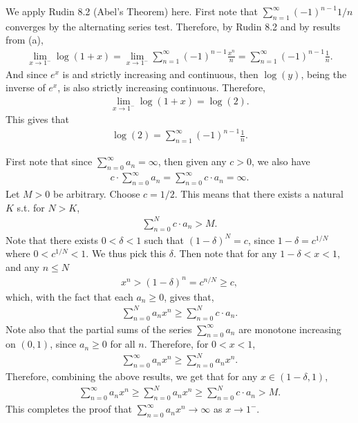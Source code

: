 \documentclass[12pt]{article}
\begin{document}
\begin{fproof}[1(b)]
 We apply Rudin 8.2 (Abel's Theorem) here.
 First note that \(\sum_{n=1}^{\infty} (-1)^{n-1}1/n\) converges by the alternating series test.
 Therefore, by Rudin 8.2 and by results from (a),
 \begin{align*}
    \lim_{x \to 1^-} \log(1+x) = \lim_{x \to 1^-} \sum_{n=1}^{\infty} (-1)^{n-1} \frac{x^n}{n}=  \sum_{n=1}^{\infty} (-1)^{n-1} \frac{1}{n}.
 \end{align*}
 And since \(e^x\) is and strictly increasing and continuous, then \(\log(y)\), being the inverse of \(e^x\), is also strictly increasing continuous. Therefore,
 \begin{align*}
    \lim_{x \to 1^-} \log(1+x) = \log(2).
 \end{align*}
 This gives that
 \begin{align*}
    \log(2) = \sum_{n=1}^{\infty} (-1)^{n-1} \frac{1}{n}. 
 \end{align*}
\end{fproof}
\newpage

\begin{fproof}[2]
 First note that since \(\sum_{n=0}^{\infty}a_n = \infty\), then given any \(c > 0\), we also have
 \begin{align*}
    c \cdot \sum_{n=0}^{\infty}a_n = \sum_{n=0}^{\infty}c \cdot a_n = \infty.
 \end{align*}
 Let \(M > 0\) be arbitrary.
 Choose \(c = 1/2\). 
 This means that there exists a natural \(K\) s.t. for \(N > K\),
 \begin{align*}
    \sum_{n=0}^{N} c \cdot a_n > M.
 \end{align*}
 Note that there exists  \(0 < \delta < 1\) such that \((1-\delta)^N = c\), since \(1 - \delta = c^{1/N}\) where \(0 < c^{1/N} < 1\).
 We thus pick this \(\delta\).
 Then note that for any \(1-\delta<x < 1\), and any \(n \leq N\)
 \begin{align*}
    x^n > (1 - \delta)^n = c^{n/N} \geq c,
 \end{align*}
 which, with the fact that each \(a_n \geq 0\), gives that,
 \begin{align*}
    \sum_{n=0}^{N} a_n x^n \geq \sum_{n=0}^{N} c \cdot a_n.
 \end{align*}
 Note also that the partial sums of the series \(\sum_{n=0}^{\infty} a_n\) are monotone increasing on \((0,1)\), since \(a_n \geq 0\) for all \(n\).
 Therefore, for \(0 < x < 1\),
 \begin{align*}
    \sum_{n=0}^{\infty} a_n x^n \geq \sum_{n=0}^{N} a_n x^n.
 \end{align*}
 Therefore, combining the above results, we get that for any \(x \in (1-\delta, 1)\),
 \begin{align*}
    \sum_{n=0}^{\infty} a_n x^n \geq \sum_{n=0}^{N} a_n x^n \geq \sum_{n=0}^{N} c \cdot a_n > M.
 \end{align*}
 This completes the proof that \(\sum_{n=0}^{\infty} a_n x^n \to \infty\) as \(x \to 1^-\).

\end{fproof}
\newpage
\end{document}
